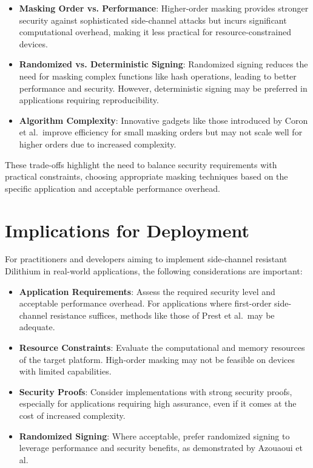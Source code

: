 \begin{itemize}
    \item \textbf{Masking Order vs. Performance}: Higher-order masking provides stronger security against sophisticated side-channel attacks but incurs significant computational overhead, making it less practical for resource-constrained devices.
    \item \textbf{Randomized vs. Deterministic Signing}: Randomized signing reduces the need for masking complex functions like hash operations, leading to better performance and security. However, deterministic signing may be preferred in applications requiring reproducibility.
    \item \textbf{Algorithm Complexity}: Innovative gadgets like those introduced by Coron et al.\ improve efficiency for small masking orders but may not scale well for higher orders due to increased complexity.
\end{itemize}

These trade-offs highlight the need to balance security requirements with practical constraints, choosing appropriate masking techniques based on the specific application and acceptable performance overhead.

\section{Implications for Deployment}

For practitioners and developers aiming to implement side-channel resistant Dilithium in real-world applications, the following considerations are important:

\begin{itemize}
    \item \textbf{Application Requirements}: Assess the required security level and acceptable performance overhead. For applications where first-order side-channel resistance suffices, methods like those of Prest et al.\ may be adequate.
    \item \textbf{Resource Constraints}: Evaluate the computational and memory resources of the target platform. High-order masking may not be feasible on devices with limited capabilities.
    \item \textbf{Security Proofs}: Consider implementations with strong security proofs, especially for applications requiring high assurance, even if it comes at the cost of increased complexity.
    \item \textbf{Randomized Signing}: Where acceptable, prefer randomized signing to leverage performance and security benefits, as demonstrated by Azouaoui et al.
\end{itemize}

